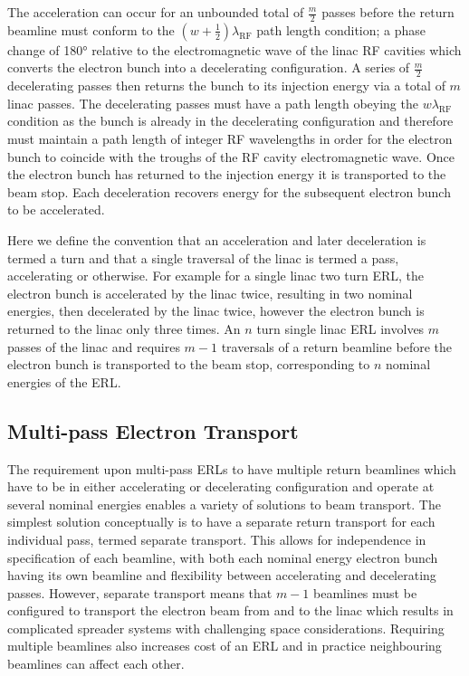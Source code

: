 \documentclass[../main.tex]{subfiles}
\begin{document}
The acceleration can occur for an unbounded total of $\frac{m}{2}$ passes before the return beamline must conform to the $\left(w+\frac{1}{2}\right)\lambda_{\mathrm{RF}}$ path length condition; a phase change of 180\si{\degree} relative to the electromagnetic wave of the linac RF cavities which converts the electron bunch into a decelerating configuration. A series of $\frac{m}{2}$ decelerating passes then returns the bunch to its injection energy via a total of $m$ linac passes. The decelerating passes must have a path length obeying the $w\lambda_{\mathrm{RF}}$ condition as the bunch is already in the decelerating configuration and therefore must maintain a path length of integer RF wavelengths in order for the electron bunch to coincide with the troughs of the RF cavity electromagnetic wave. Once the electron bunch has returned to the injection energy it is transported to the beam stop. Each deceleration recovers energy for the subsequent electron bunch to be accelerated.        

Here we define the convention that an acceleration and later deceleration is termed a turn and that a single traversal of the linac is termed a pass, accelerating or otherwise. For example for a single linac two turn ERL, the electron bunch is accelerated by the linac twice, resulting in two nominal energies, then decelerated by the linac twice, however the electron bunch is returned to the linac only three times. An $n$ turn single linac ERL involves $m$ passes of the linac and requires $m-1$ traversals of a return beamline before the electron bunch is transported to the beam stop, corresponding to $n$ nominal energies of the ERL.   

\subsection{Multi-pass Electron Transport}

The requirement upon multi-pass ERLs to have multiple return beamlines which have to be in either accelerating or decelerating configuration and operate at several nominal energies enables a variety of solutions to beam transport. The simplest solution conceptually is to have a separate return transport for each individual pass, termed separate transport. This allows for independence in specification of each beamline, with both each nominal energy electron bunch having its own beamline and flexibility between accelerating and decelerating passes. However, separate transport means that $m-1$ beamlines must be configured to transport the electron beam from and to the linac which results in complicated spreader systems with challenging space considerations. Requiring multiple beamlines also increases cost of an ERL and in practice neighbouring beamlines can affect each other.
\end{document}
